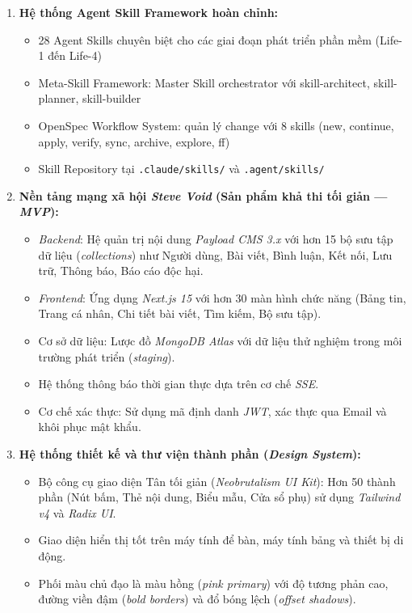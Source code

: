 \documentclass[13pt,a4paper,oneside]{extreport}
\numberwithin{equation}{chapter}
\numberwithin{figure}{chapter}
\numberwithin{table}{chapter}
\begin{document}
\begin{enumerate}
    \item \textbf{Hệ thống Agent Skill Framework hoàn chỉnh:}
    \begin{itemize}
        \item 28 Agent Skills chuyên biệt cho các giai đoạn phát triển phần mềm (Life-1 đến Life-4)
        \item Meta-Skill Framework: Master Skill orchestrator với skill-architect, skill-planner, skill-builder
        \item OpenSpec Workflow System: quản lý change với 8 skills (new, continue, apply, verify, sync, archive, explore, ff)
        \item Skill Repository tại \texttt{.claude/skills/} và \texttt{.agent/skills/}
    \end{itemize}

    \item \textbf{Nền tảng mạng xã hội \textit{Steve Void} (Sản phẩm khả thi tối giản — \textit{MVP}):}
    \begin{itemize}
        \item \textit{Backend}: Hệ quản trị nội dung \textit{Payload CMS 3.x} với hơn 15 bộ sưu tập dữ liệu (\textit{collections}) như Người dùng, Bài viết, Bình luận, Kết nối, Lưu trữ, Thông báo, Báo cáo độc hại.
        \item \textit{Frontend}: Ứng dụng \textit{Next.js 15} với hơn 30 màn hình chức năng (Bảng tin, Trang cá nhân, Chi tiết bài viết, Tìm kiếm, Bộ sưu tập).
        \item Cơ sở dữ liệu: Lược đồ \textit{MongoDB Atlas} với dữ liệu thử nghiệm trong môi trường phát triển (\textit{staging}).
        \item Hệ thống thông báo thời gian thực dựa trên cơ chế \textit{SSE}.
        \item Cơ chế xác thực: Sử dụng mã định danh \textit{JWT}, xác thực qua Email và khôi phục mật khẩu.
    \end{itemize}

    \item \textbf{Hệ thống thiết kế và thư viện thành phần (\textit{Design System}):}
    \begin{itemize}
        \item Bộ công cụ giao diện Tân tối giản (\textit{Neobrutalism UI Kit}): Hơn 50 thành phần (Nút bấm, Thẻ nội dung, Biểu mẫu, Cửa sổ phụ) sử dụng \textit{Tailwind v4} và \textit{Radix UI}.
        \item Giao diện hiển thị tốt trên máy tính để bàn, máy tính bảng và thiết bị di động.
        \item Phối màu chủ đạo là màu hồng (\textit{pink primary}) với độ tương phản cao, đường viền đậm (\textit{bold borders}) và đổ bóng lệch (\textit{offset shadows}).
    \end{itemize}
\end{enumerate}
\end{document}
